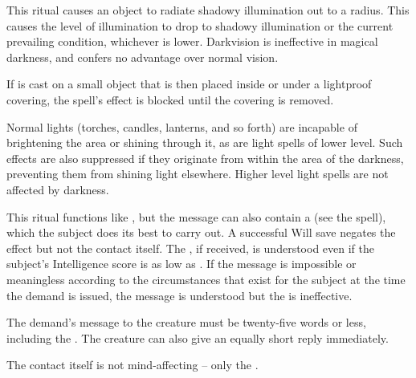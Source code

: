 \spellrng{\rngtouch}
\begin{spelleffect}
  This ritual causes an object to radiate shadowy illumination out to a \areamed radius. This causes the level of illumination to drop to shadowy illumination or the current prevailing condition, whichever is lower. Darkvision is ineffective in magical darkness, and confers no advantage over normal vision.
\end{spelleffect}
\begin{spellnotes}
  If  is cast on a small object that is then placed inside or under a lightproof covering, the spell's effect is blocked until the covering is removed.

  Normal lights (torches, candles, lanterns, and so forth) are incapable of brightening the area or shining through it, as are light spells of lower level. Such effects are also suppressed if they originate from within the area of the darkness, preventing them from shining light elsewhere. Higher level light spells are not affected by darkness.
\end{spellnotes}

\begin{spelleffect}
This ritual functions like , but the message can also contain a  (see the  spell), which the subject does its best to carry out. A successful Will save negates the  effect but not the contact itself. The , if received, is understood even if the subject's Intelligence score is as low as . If the message is impossible or meaningless according to the circumstances that exist for the subject at the time the demand is issued, the message is understood but the  is ineffective.
\par The demand's message to the creature must be twenty-five words or less, including the . The creature can also give an equally short reply immediately.
\end{spelleffect}
\begin{spellnotes}
The contact itself is not mind-affecting -- only the .
\end{spellnotes}

